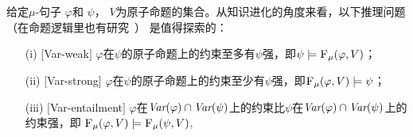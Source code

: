 给定$\mu$-句子 $\varphi$和 $\psi$， $V$为原子命题的集合。从知识进化的角度来看，以下推理问题（在命题逻辑里也有研究~\cite{wang2015forgetting}） 是值得探索的：

\begin{itemize}
	\item[(i)] $[$Var-weak$]$ $\varphi$在$\psi$的原子命题上的约束至多有$\psi$强，即$\psi\models {\textsc{F}_{\textsc{$\mu$}}}(\varphi, V)$；
	\item[(ii)] $[$Var-strong$]$ $\varphi$在$\psi$的原子命题上的约束至少有$\psi$强，即${\textsc{F}_{\textsc{$\mu$}}}(\varphi, V)\models \psi$；
	\item[(iii)] $[$Var-entailment$]$ $\varphi$在$\textit{Var}(\varphi) \cap \textit{Var}(\psi)$上的约束比$\psi$在$\textit{Var}(\varphi) \cap \textit{Var}(\psi)$上的约束强，即 ${\textsc{F}_{\textsc{$\mu$}}}(\varphi, V) \models {\textsc{F}_{\textsc{$\mu$}}}(\psi, V)$,
\end{itemize}

